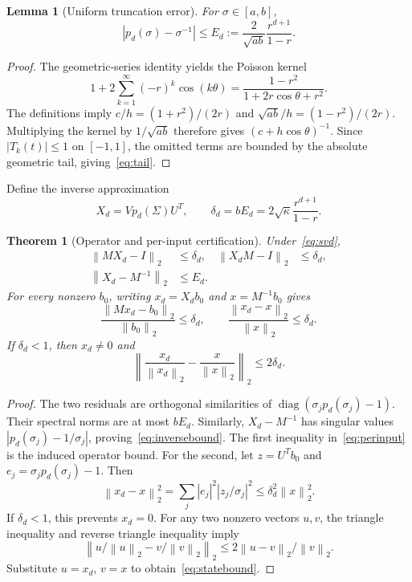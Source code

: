 \documentclass[journal]{IEEEtran}
\newtheorem{theorem}{Theorem}
\newtheorem{lemma}{Lemma}
\newcommand{\norm}[1]{\left\lVert#1\right\rVert}
\begin{document}
\begin{lemma}[Uniform truncation error]
For $\sigma\in[a,b]$,
\begin{equation}
 \left|p_d(\sigma)-\sigma^{-1}\right|
 \leq E_d:=\frac{2}{\sqrt{ab}}\frac{r^{d+1}}{1-r}.
 \label{eq:tail}
\end{equation}
\end{lemma}
\begin{proof}
The geometric-series identity yields the Poisson kernel
\[
 1+2\sum_{k=1}^{\infty}(-r)^k\cos(k\theta)
 =\frac{1-r^2}{1+2r\cos\theta+r^2}.
\]
The definitions imply $c/h=(1+r^2)/(2r)$ and
$\sqrt{ab}/h=(1-r^2)/(2r)$. Multiplying the kernel by $1/\sqrt{ab}$ therefore
gives $(c+h\cos\theta)^{-1}$. Since $|T_k(t)|\leq1$ on $[-1,1]$, the omitted
terms are bounded by the absolute geometric tail, giving~\eqref{eq:tail}.
\end{proof}

Define the inverse approximation
\begin{equation}
 X_d=V p_d(\Sigma)U^T,\qquad
 \delta_d=bE_d=2\sqrt\kappa\frac{r^{d+1}}{1-r}.
 \label{eq:delta}
\end{equation}

\begin{theorem}[Operator and per-input certification]
Under~\eqref{eq:svd},
\begin{align}
 \norm{MX_d-I}_2&\leq\delta_d, &
 \norm{X_dM-I}_2&\leq\delta_d,\label{eq:operatorbound}\\
 \norm{X_d-M^{-1}}_2&\leq E_d. &&\label{eq:inversebound}
\end{align}
For every nonzero $b_0$, writing $x_d=X_db_0$ and $x=M^{-1}b_0$ gives
\begin{equation}
 \frac{\norm{Mx_d-b_0}_2}{\norm{b_0}_2}\leq\delta_d,
 \qquad
 \frac{\norm{x_d-x}_2}{\norm{x}_2}\leq\delta_d.
 \label{eq:perinput}
\end{equation}
If $\delta_d<1$, then $x_d\ne0$ and
\begin{equation}
 \left\lVert\frac{x_d}{\norm{x_d}_2}
             -\frac{x}{\norm{x}_2}\right\rVert_2\leq2\delta_d.
 \label{eq:statebound}
\end{equation}
\end{theorem}
\begin{proof}
The two residuals are orthogonal similarities of
$\operatorname{diag}(\sigma_jp_d(\sigma_j)-1)$. Their spectral norms are at
most $bE_d$. Similarly, $X_d-M^{-1}$ has singular values
$|p_d(\sigma_j)-1/\sigma_j|$, proving~\eqref{eq:inversebound}.
The first inequality in~\eqref{eq:perinput} is the induced operator bound.
For the second, let $z=U^Tb_0$ and
$e_j=\sigma_jp_d(\sigma_j)-1$. Then
\[
 \norm{x_d-x}_2^2
 =\sum_j |e_j|^2|z_j/\sigma_j|^2
 \leq\delta_d^2\norm{x}_2^2.
\]
If $\delta_d<1$, this prevents $x_d=0$. For any two nonzero vectors $u,v$,
the triangle inequality and reverse triangle inequality imply
\[
 \norm{u/\norm{u}_2-v/\norm{v}_2}_2
 \leq 2\norm{u-v}_2/\norm{v}_2.
\]
Substitute $u=x_d$, $v=x$ to obtain~\eqref{eq:statebound}.
\end{proof}
\end{document}
